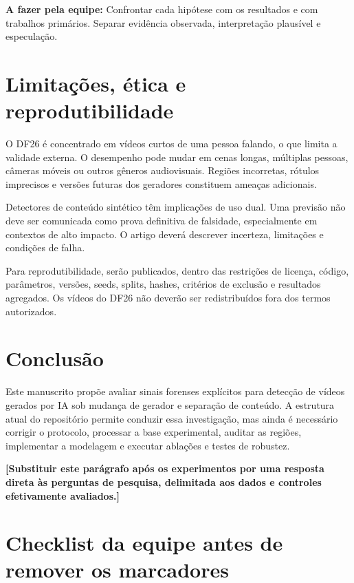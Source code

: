 \documentclass[11pt,a4paper]{article}
\newcommand{\afazer}[1]{%
  \par\smallskip
  \noindent\textcolor{red!70!black}{\textbf{A fazer pela equipe:} #1}
  \par\smallskip
}
\begin{document}
\afazer{Confrontar cada hipótese com os resultados e com trabalhos primários.
Separar evidência observada, interpretação plausível e especulação.}

\section{Limitações, ética e reprodutibilidade}

O DF26 é concentrado em vídeos curtos de uma pessoa falando, o que limita a
validade externa. O desempenho pode mudar em cenas longas, múltiplas pessoas,
câmeras móveis ou outros gêneros audiovisuais. Regiões incorretas, rótulos
imprecisos e versões futuras dos geradores constituem ameaças adicionais.

Detectores de conteúdo sintético têm implicações de uso dual. Uma previsão não
deve ser comunicada como prova definitiva de falsidade, especialmente em
contextos de alto impacto. O artigo deverá descrever incerteza, limitações e
condições de falha.

Para reprodutibilidade, serão publicados, dentro das restrições de licença,
código, parâmetros, versões, seeds, splits, hashes, critérios de exclusão e
resultados agregados. Os vídeos do DF26 não deverão ser redistribuídos fora dos
termos autorizados.

\section{Conclusão}

Este manuscrito propõe avaliar sinais forenses explícitos para detecção de
vídeos gerados por IA sob mudança de gerador e separação de conteúdo. A
estrutura atual do repositório permite conduzir essa investigação, mas ainda é
necessário corrigir o protocolo, processar a base experimental, auditar as
regiões, implementar a modelagem e executar ablações e testes de robustez.

\textbf{[Substituir este parágrafo após os experimentos por uma resposta direta
às perguntas de pesquisa, delimitada aos dados e controles efetivamente
avaliados.]}

\appendix

\section{Checklist da equipe antes de remover os marcadores}
\end{document}
